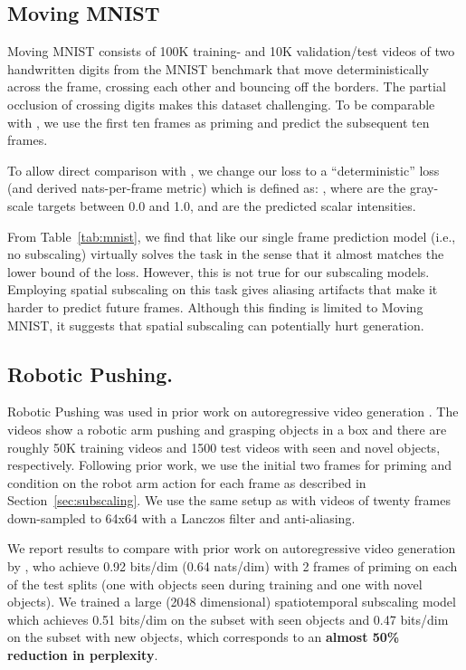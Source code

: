 \documentclass{article} \usepackage{iclr2020_conference,times}
\begin{document}
\subsection{Moving MNIST}

Moving MNIST \citep{Srivastava2015MovingMNIST} consists of 100K training- and 10K validation/test videos of two handwritten digits from the MNIST benchmark that move deterministically across the frame, crossing each other and bouncing off the borders.
The partial occlusion of crossing digits makes this dataset challenging.
To be comparable with \citet{Kalchbrenner2016VideoPN}, we use the first ten frames as priming and predict the subsequent ten frames.

To allow direct comparison with \citet{Kalchbrenner2016VideoPN}, we change our loss to a ``deterministic'' loss (and derived nats-per-frame metric) which is defined as: , where  are the gray-scale targets between 0.0 and 1.0, and  are the predicted scalar intensities.

From Table~\ref{tab:mnist}, we find that like \citet{Kalchbrenner2016VideoPN} our single frame prediction model (i.e., no subscaling) virtually solves the task in the sense that it almost matches the lower bound of the loss. However, this is not true for our subscaling models. Employing spatial subscaling on this task gives aliasing artifacts that make it harder to predict future frames. Although this finding is limited to Moving MNIST, it suggests that spatial subscaling can potentially hurt generation.

\subsection{Robotic Pushing.}


Robotic Pushing \citep{Finn2016RobotPushing} was used in prior work on autoregressive video generation \citep{Kalchbrenner2016VideoPN}. The videos show a robotic arm pushing and grasping objects in a box and there are roughly 50K training videos and 1500 test videos with seen and novel objects, respectively.
Following prior work, we use the initial two frames for priming and condition on the robot arm action for each frame as described in Section~\ref{sec:subscaling}. We use the same setup as \citep{Kalchbrenner2016VideoPN} with videos of twenty frames down-sampled to 64x64 with a Lanczos filter and anti-aliasing.

We report results to compare with prior work on autoregressive video generation by \citet{Kalchbrenner2016VideoPN}, who achieve 0.92 bits/dim (0.64 nats/dim) with 2 frames of priming on each of the test splits (one with objects seen during training and one with novel objects). We trained a large (2048 dimensional) spatiotemporal subscaling model which achieves 0.51 bits/dim on the subset with seen objects and 0.47 bits/dim on the subset with new objects, which corresponds to an \textbf{almost 50\% reduction in perplexity}.
\end{document}
